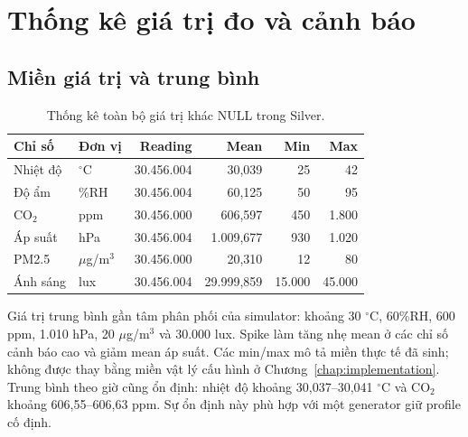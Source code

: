 \section{Thống kê giá trị đo và cảnh báo}

\subsection{Miền giá trị và trung bình}
\begin{table}[H]
\centering
\caption{Thống kê toàn bộ giá trị khác NULL trong Silver.}
\label{tab:metric-statistics}
\small
\begin{tabular}{l l r r r r}
\toprule
\textbf{Chỉ số} & \textbf{Đơn vị} & \textbf{Reading} & \textbf{Mean} & \textbf{Min} & \textbf{Max} \\
\midrule
Nhiệt độ & $^\circ$C & 30.456.004 & 30,039 & 25 & 42 \\
Độ ẩm & \%RH & 30.456.004 & 60,125 & 50 & 95 \\
CO$_2$ & ppm & 30.456.000 & 606,597 & 450 & 1.800 \\
Áp suất & hPa & 30.456.004 & 1.009,677 & 930 & 1.020 \\
PM2.5 & $\mu$g/m$^3$ & 30.456.000 & 20,310 & 12 & 80 \\
Ánh sáng & lux & 30.456.004 & 29.999,859 & 15.000 & 45.000 \\
\bottomrule
\end{tabular}
\end{table}

Giá trị trung bình gần tâm phân phối của simulator: khoảng 30 $^\circ$C, 60\%RH, 600 ppm, 1.010 hPa, 20 $\mu$g/m$^3$ và 30.000 lux. Spike làm tăng nhẹ mean ở các chỉ số cảnh báo cao và giảm mean áp suất. Các min/max mô tả miền thực tế đã sinh; không được thay bằng miền vật lý cấu hình ở Chương~\ref{chap:implementation}. Trung bình theo giờ cũng ổn định: nhiệt độ khoảng 30,037--30,041 $^\circ$C và CO$_2$ khoảng 606,55--606,63 ppm. Sự ổn định này phù hợp với một generator giữ profile cố định.

